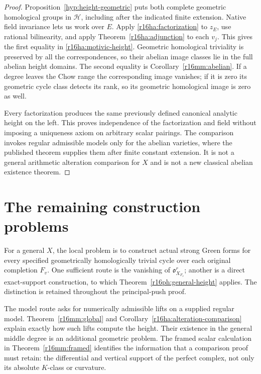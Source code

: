 \documentclass[11pt,a4paper]{article}
\theoremstyle{definition}
\theoremstyle{remark}
\numberwithin{equation}{section}
\begin{document}
\begin{proof}
Proposition~\ref{hyp:height-geometric} puts both complete geometric
homological groups in $\mathcal H$, including after the indicated
finite extension. Native field invariance lets us work over $E$.
Apply \eqref{r16ha:factorization} to $z_E$, use rational
bilinearity, and apply Theorem~\ref{r16ha:adjunction} to each
$v_j$. This gives the first equality in
\eqref{r16ha:motivic-height}. Geometric homological triviality
is preserved by all the correspondences, so their abelian
image classes lie in the full abelian height domains.
The second equality is Corollary~\ref{r16mm:abelian}.
If a degree leaves the Chow range the corresponding image
vanishes; if it is zero its geometric cycle class detects its
rank, so its geometric homological image is zero as well.

Every factorization produces the same previously defined
canonical analytic height on the left. This proves independence
of the factorization and field without imposing a uniqueness
axiom on arbitrary scalar pairings. The comparison invokes
regular admissible models only for the abelian varieties,
where the published theorem supplies them after finite constant
extension. It is not a general arithmetic alteration comparison
for $X$ and is not a new classical abelian existence theorem.
\end{proof}




\section{The remaining construction problems}\label{sec:height-remaining}

For a general $X$, the local problem is to construct actual strong Green forms for every specified geometrically homologically trivial cycle over each original completion $F_v$. One sufficient route is the vanishing of $\mathfrak o_{X_{F_v}}^r$; another is a direct exact-support construction, to which Theorem~\ref{r16ph:general-height} applies. The distinction is retained throughout the principal-push proof.

The model route asks for numerically admissible lifts on a supplied regular model. Theorem~\ref{r16mm:global} and Corollary~\ref{r16ha:alteration-comparison} explain exactly how such lifts compute the height. Their existence in the general middle degree is an additional geometric problem. The framed scalar calculation in Theorem~\ref{r16mm:framed} identifies the information that a comparison proof must retain: the differential and vertical support of the perfect complex, not only its absolute $K$-class or curvature.
\end{document}

